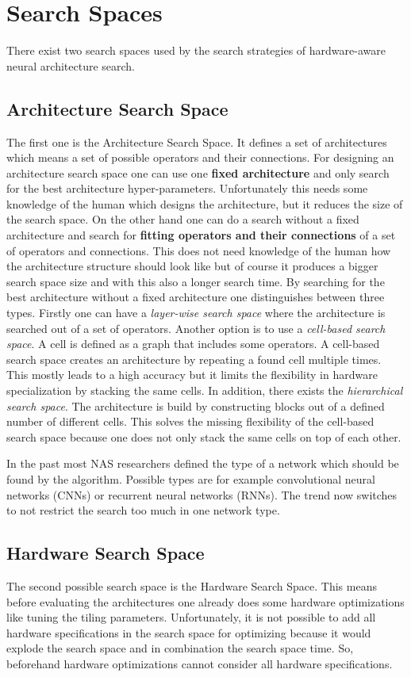 \documentclass[conference]{IEEEtran}
\begin{document}
\section{Search Spaces}
\label{section:SearchSpaces}
There exist two search spaces used by the search strategies of hardware-aware neural architecture search. 

\subsection{Architecture Search Space}
The first one is the Architecture Search Space. It defines a set of architectures which means a set of possible operators and their connections. For designing an architecture search space one can use one \textbf{fixed architecture} and only search for the best architecture hyper-parameters. Unfortunately this needs some knowledge of the human which designs the architecture, but it reduces the size of the search space. On the other hand one can do a search without a fixed architecture and search for \textbf{fitting operators and their connections} of a set of operators and connections. This does not need knowledge of the human how the architecture structure should look like but of course it produces a bigger search space size and with this also a longer search time. By searching for the best architecture without a fixed architecture one distinguishes between three types. Firstly one can have a \textit{layer-wise search space} where the architecture is searched out of a set of operators. Another option is to use a \textit{cell-based search space}. A cell is defined as a graph that includes some operators. A cell-based search space creates an architecture by repeating a found cell multiple times. This mostly leads to a high accuracy but it limits the flexibility in hardware specialization by stacking the same cells. In addition, there exists the \textit{hierarchical search space}. The architecture is build by constructing blocks out of a defined number of different cells. This solves the missing flexibility of the cell-based search space because one does not only stack the same cells on top of each other. 

In the past most NAS researchers defined the type of a network which should be found by the algorithm. Possible types are for example convolutional neural networks (CNNs) or recurrent neural networks (RNNs). The trend now switches to not restrict the search too much in one network type. 

\subsection{Hardware Search Space}
The second possible search space is the Hardware Search Space. This means before evaluating the architectures one already does some hardware optimizations like tuning the tiling parameters. Unfortunately, it is not possible to add all hardware specifications in the search space for optimizing because it would explode the search space and in combination the search space time. So, beforehand hardware optimizations cannot consider all hardware specifications.
\end{document}
